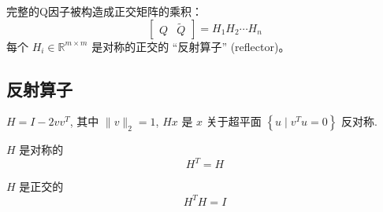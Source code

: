 完整的Q因子被构造成正交矩阵的乘积：
$$
\left[\begin{array}{ll}
Q & \tilde{Q}
\end{array}\right]=H_{1} H_{2} \cdots H_{n}
$$
每个 $ H_{i} \in \mathbb{R}^{m \times m} $ 是对称的正交的 “反射算子” (reflector)。


\subsection{反射算子}

\begin{theorem}
    $ H=I-2 v v^{T} $, 其中 $ \|v\|_{2}=1 $, $ H x $ 是 $ x $ 关于超平面 $ \left\{u \mid v^{T} u=0\right\} $ 反对称.

    $ H $ 是对称的 
    $$ H^{T}=H $$

$ H $ 是正交的 
$$ H^{T} H=I $$
\end{theorem}
    

